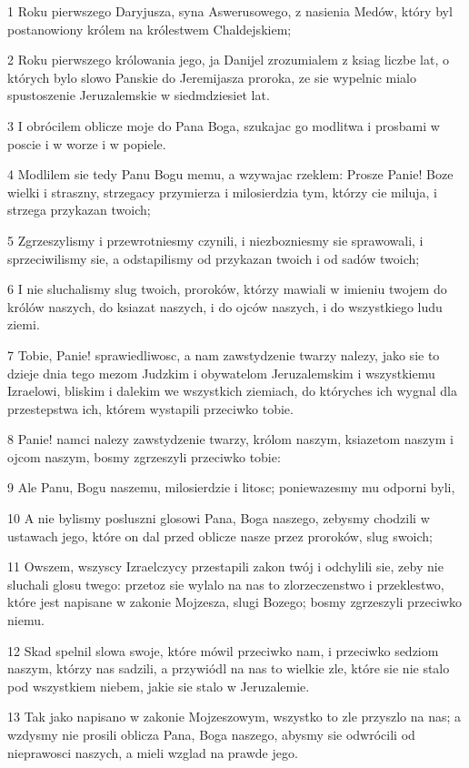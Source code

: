 \par 1 Roku pierwszego Daryjusza, syna Aswerusowego, z nasienia Medów, który byl postanowiony królem na królestwem Chaldejskiem;
\par 2 Roku pierwszego królowania jego, ja Danijel zrozumialem z ksiag liczbe lat, o których bylo slowo Panskie do Jeremijasza proroka, ze sie wypelnic mialo spustoszenie Jeruzalemskie w siedmdziesiet lat.
\par 3 I obrócilem oblicze moje do Pana Boga, szukajac go modlitwa i prosbami w poscie i w worze i w popiele.
\par 4 Modlilem sie tedy Panu Bogu memu, a wzywajac rzeklem: Prosze Panie! Boze wielki i straszny, strzegacy przymierza i milosierdzia tym, którzy cie miluja, i strzega przykazan twoich;
\par 5 Zgrzeszylismy i przewrotniesmy czynili, i niezbozniesmy sie sprawowali, i sprzeciwilismy sie, a odstapilismy od przykazan twoich i od sadów twoich;
\par 6 I nie sluchalismy slug twoich, proroków, którzy mawiali w imieniu twojem do królów naszych, do ksiazat naszych, i do ojców naszych, i do wszystkiego ludu ziemi.
\par 7 Tobie, Panie! sprawiedliwosc, a nam zawstydzenie twarzy nalezy, jako sie to dzieje dnia tego mezom Judzkim i obywatelom Jeruzalemskim i wszystkiemu Izraelowi, bliskim i dalekim we wszystkich ziemiach, do któryches ich wygnal dla przestepstwa ich, którem wystapili przeciwko tobie.
\par 8 Panie! namci nalezy zawstydzenie twarzy, królom naszym, ksiazetom naszym i ojcom naszym, bosmy zgrzeszyli przeciwko tobie:
\par 9 Ale Panu, Bogu naszemu, milosierdzie i litosc; poniewazesmy mu odporni byli,
\par 10 A nie bylismy posluszni glosowi Pana, Boga naszego, zebysmy chodzili w ustawach jego, które on dal przed oblicze nasze przez proroków, slug swoich;
\par 11 Owszem, wszyscy Izraelczycy przestapili zakon twój i odchylili sie, zeby nie sluchali glosu twego: przetoz sie wylalo na nas to zlorzeczenstwo i przeklestwo, które jest napisane w zakonie Mojzesza, slugi Bozego; bosmy zgrzeszyli przeciwko niemu.
\par 12 Skad spelnil slowa swoje, które mówil przeciwko nam, i przeciwko sedziom naszym, którzy nas sadzili, a przywiódl na nas to wielkie zle, które sie nie stalo pod wszystkiem niebem, jakie sie stalo w Jeruzalemie.
\par 13 Tak jako napisano w zakonie Mojzeszowym, wszystko to zle przyszlo na nas; a wzdysmy nie prosili oblicza Pana, Boga naszego, abysmy sie odwrócili od nieprawosci naszych, a mieli wzglad na prawde jego.
